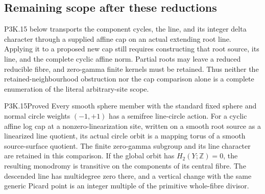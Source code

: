 \subsection{Remaining scope after these reductions}

P3K.15 below transports the component cycles, the line, and its integer
delta character through a supplied affine cap on an actual extending
root line.  Applying it to a proposed new cap still requires constructing
that root source, its line, and the complete cyclic affine norm.  Partial
roots may leave a reduced reducible fibre, and zero-gamma finite kernels
must be retained.  Thus neither the retained-neighbourhood obstruction
nor the cap comparison alone is a complete enumeration of the literal
arbitrary-site scope.

\begin{statement}{P3K.15}{Proved}
Every smooth sphere member with the standard fixed sphere and
normal circle weights \((-1,+1)\) has a semifree line-circle
action.  For a cyclic affine log cap at a nonzero-linearization
site, written on a smooth root source as a linearized line quotient, its actual circle orbit is
a mapping torus of a smooth source-surface quotient.  The finite
zero-gamma subgroup and its line character are retained in this
comparison.  If the global orbit has \(H_2(Y;\mathbb Z)=0\),
the resulting monodromy is transitive on the components of its
central fibre.  The descended line has multidegree zero there,
and a vertical change with the same generic Picard point is an
integer multiple of the primitive whole-fibre divisor.
\end{statement}

